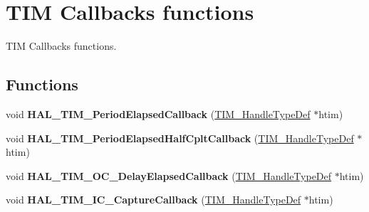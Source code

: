 \hypertarget{group___t_i_m___exported___functions___group9}{}\section{T\+IM Callbacks functions}
\label{group___t_i_m___exported___functions___group9}


T\+IM Callbacks functions.  


\subsection*{Functions}
\begin{DoxyCompactItemize}
\item 
\mbox{\label{group___t_i_m___exported___functions___group9_ga8a3b0ad512a6e6c6157440b68d395eac}} 
void {\bfseries H\+A\+L\+\_\+\+T\+I\+M\+\_\+\+Period\+Elapsed\+Callback} (\mbox{\hyperlink{struct_t_i_m___handle_type_def}{T\+I\+M\+\_\+\+Handle\+Type\+Def}} $\ast$htim)
\item 
\mbox{\label{group___t_i_m___exported___functions___group9_ga1f7478d689916e5888f62f97cf4acef3}} 
void {\bfseries H\+A\+L\+\_\+\+T\+I\+M\+\_\+\+Period\+Elapsed\+Half\+Cplt\+Callback} (\mbox{\hyperlink{struct_t_i_m___handle_type_def}{T\+I\+M\+\_\+\+Handle\+Type\+Def}} $\ast$htim)
\item 
\mbox{\label{group___t_i_m___exported___functions___group9_ga1fc39499fe9db8b7fb88005e9f107a36}} 
void {\bfseries H\+A\+L\+\_\+\+T\+I\+M\+\_\+\+O\+C\+\_\+\+Delay\+Elapsed\+Callback} (\mbox{\hyperlink{struct_t_i_m___handle_type_def}{T\+I\+M\+\_\+\+Handle\+Type\+Def}} $\ast$htim)
\item 
\mbox{\label{group___t_i_m___exported___functions___group9_ga77a2401a35ddd9bd0b8fc28331b81381}} 
void {\bfseries H\+A\+L\+\_\+\+T\+I\+M\+\_\+\+I\+C\+\_\+\+Capture\+Callback} (\mbox{\hyperlink{struct_t_i_m___handle_type_def}{T\+I\+M\+\_\+\+Handle\+Type\+Def}} $\ast$htim)
\item 
\mbox{\label{group___t_i_m___exported___functions___group9_ga25ada83fb758075401f1bb9ba1925322}} 

\end{DoxyCompactItemize}
